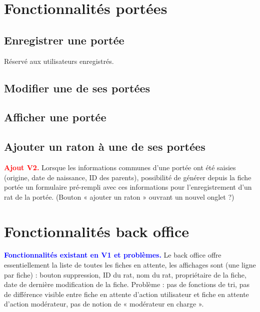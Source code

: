 \documentclass[a4paper,10pt]{article}
\newcommand\existant[1]{\noindent\textbf{\textcolor{blue}{#1}}}
\newcommand\desire[1]{\noindent\textbf{\textcolor{red}{#1}}}
\begin{document}
\section{Fonctionnalités portées}

\subsection{Enregistrer une portée}
Réservé aux utilisateurs enregistrés.

\subsection{Modifier une de ses portées} 

\subsection{Afficher une portée} 

\subsection{Ajouter un raton à une de ses portées}
 
\desire{Ajout V2.} Lorsque les informations communes d'une portée ont été saisies (origine, date de naissance, ID des parents), possibilité de générer depuis la fiche portée un formulaire pré-rempli avec ces informations pour l'enregistrement d'un rat de la portée. (Bouton « ajouter un raton » ouvrant un nouvel onglet ?)  

\section{Fonctionnalités back office}
\label{sec:backoffice}
\existant{Fonctionnalités existant en V1 et problèmes.} Le back office offre essentiellement la liste de toutes les fiches en attente, les affichages sont (une ligne par fiche) : bouton suppression, ID du rat, nom du rat, propriétaire de la fiche, date de dernière modification de la fiche. Problème : pas de fonctions de tri, pas de différence visible entre fiche en attente d'action utilisateur et fiche en attente d'action modérateur, pas de notion de « modérateur en charge ».  
\end{document}
